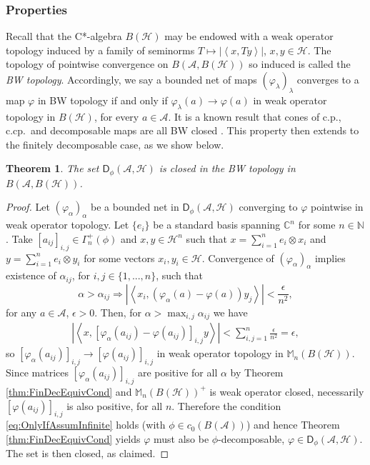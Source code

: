 \documentclass[reqno]{amsart}
\newtheorem{theorem}{Theorem}
\theoremstyle{plain}
\numberwithin{equation}{section}
\numberwithin{theorem}{section}
\numberwithin{lemma}{section}
\numberwithin{definition}{section}
\numberwithin{corollary}{section}
\numberwithin{remark}{section}
\newcommand{\naturals}{\mathbb{N}}
\newcommand{\complexes}{\mathbb{C}}
\newcommand{\iprod}[2]{\left\langle #1, #2 \right\rangle}
\newcommand{\hilbert}{\mathcal{H}}
\newcommand{\matra}[2]{\mathbb{M}_{#1}(#2)}
\newcommand{\gdec}[3]{\mathsf{D}_{#1}(#2,#3)}
\begin{document}
\subsubsection{Properties}

Recall that the C*-algebra $B(\mathcal{\hilbert})$ may be endowed with a weak operator topology induced by a family of seminorms $T\mapsto \left| \iprod{x}{Ty}\right|$, $x,y \in \mathcal{\hilbert}$. The topology of pointwise convergence on $B(\mathscr{A},B(\mathcal{\hilbert}))$ so induced is called the \emph{BW topology}. Accordingly, we say a bounded net of maps $\left(\varphi_\lambda\right)_\lambda$ converges to a map $\varphi$ in BW topology if and only if $\varphi_\lambda (a) \to \varphi(a)$ in weak operator topology in $B(\mathcal{\hilbert})$, for every $a\in\mathscr{A}$. It is a known result that cones of c.p., c.cp.~and decomposable maps are all BW closed \cite{Stoermer2013}. This property then extends to the finitely decomposable case, as we show below.

\begin{theorem}\label{thm:DphiFinClosed}
    The set $\gdec{\phi}{\mathscr{A}}{\hilbert}$ is closed in the BW topology in $B(\mathscr{A},B(\hilbert))$.
\end{theorem}

\begin{proof}
    Let $\left(\varphi_\alpha\right)_\alpha$ be a bounded net in $\gdec{\phi}{\mathscr{A}}{\hilbert}$ converging to $\varphi$ pointwise in weak operator topology. Let $\{e_i\}$ be a standard basis spanning $\complexes^n$ for some $n\in\naturals$. Take $[a_{ij}]_{i,j} \in \Gamma_{n}^{+}(\phi)$ and $x,y \in \hilbert^n$ such that $x = \sum_{i=1}^{n} e_i \otimes x_i$ and $y = \sum_{i=1}^{n} e_i \otimes y_i$ for some vectors $x_i, y_i \in \hilbert$. Convergence of $\left(\varphi_\alpha\right)_\alpha$ implies existence of $\alpha_{ij}$, for $i,j \in \{1,...,n\}$, such that
    \begin{equation}
        \alpha > \alpha_{ij} \Rightarrow \left|\iprod{x_i}{\left(\varphi_\alpha (a) - \varphi(a)\right)y_j}\right| < \frac{\epsilon}{n^2},
    \end{equation}
    for any $a\in\mathscr{A}$, $\epsilon > 0$. Then, for $\alpha > \max_{i,j}{\alpha_{ij}}$ we have
    \begin{align}
        \left|\iprod{x}{\left[\varphi_\alpha (a_{ij}) - \varphi (a_{ij})\right]_{i,j}y}\right| < \sum_{i,j=1}^{n} \frac{\epsilon}{n^2} = \epsilon,
    \end{align}
    so $\left[\varphi_\alpha (a_{ij})\right]_{i,j}\to\left[\varphi (a_{ij})\right]_{i,j}$ in weak operator topology in $\matra{n}{B(\hilbert)}$. Since matrices $\left[\varphi_\alpha (a_{ij})\right]_{i,j}$ are positive for all $\alpha$ by Theorem \ref{thm:FinDecEquivCond} and $\matra{n}{B(\hilbert)}^+$ is weak operator closed, necessarily $\left[\varphi (a_{ij})\right]_{i,j}$ is also positive, for all $n$. Therefore the condition \eqref{eq:OnlyIfAssumInfinite} holds (with $\phi \in c_0 (B(\mathscr{A}))$) and hence Theorem \ref{thm:FinDecEquivCond} yields $\varphi$ must also be $\phi$-decomposable, $\varphi \in \gdec{\phi}{\mathscr{A}}{\hilbert}$. The set is then closed, as claimed.
\end{proof}
\end{document}
